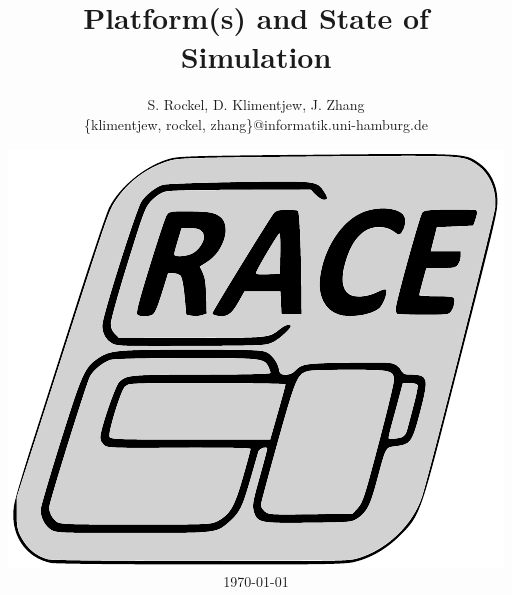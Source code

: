 




\title[Platforms and Simulation]{Platform(s) and State of Simulation}


\author[S. Rockel, D. Klimentjew, J. Zhang]{S. Rockel, D. Klimentjew, J. Zhang\textbf{}\\
{\small \{klimentjew, rockel, zhang\}@informatik.uni-hamburg.de\vspace{-1em}
}}


\date{\includegraphics[width=0.13\paperwidth]{images/RACE-Logo-Slanting-PROPOSAL-grayscale}\\
\today}

\makebeamertitle


